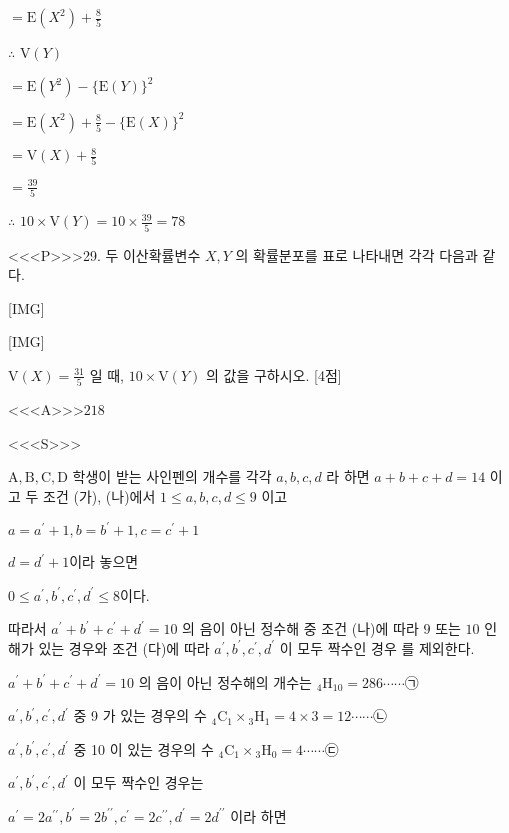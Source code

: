 \documentclass{oblivoir}
\begin{document}
$= \mathrm{E}\left(X^{2}\right)+\frac{8}{5}$

$\therefore$ $\mathrm{V}(Y)$

$=\mathrm{E}\left(Y^{2}\right)-\{\mathrm{E}(Y)\}^{2}$

$=\mathrm{E}\left(X^{2}\right)+\frac{8}{5}-\{\mathrm{E}(X)\}^{2}$

$=\mathrm{V}(X)+\frac{8}{5}$

$=\frac{39}{5}$

$\therefore$ $10 \times \mathrm{V}(Y)=10 \times \frac{39}{5}=78 $


<<<P>>>29. 두 이산확률변수 $X, Y$ 의 확률분포를 표로 나타내면 각각 다음과 같다.

[IMG]

[IMG]

$\mathrm{V}(X)=\frac{31}{5}$ 일 때, $10 \times \mathrm{V}(Y)$ 의 값을 구하시오. [4점]

<<<A>>>$218$

<<<S>>>



$\mathrm{A}, \mathrm{B}, \mathrm{C}, \mathrm{D}$ 학생이 받는 사인펜의 개수를 각각 $a, b, c, d$ 라 하면 $a+b+c+d=14$ 이고
두 조건 (가), (나)에서 $1 \leq a, b, c, d \leq 9$ 이고

$a=a^{\prime}+1, b=b^{\prime}+1, c=c^{\prime}+1$

$d=d^{\prime}+1$이라 놓으면

$0 \leq a^{\prime}, b^{\prime}, c^{\prime}, d^{\prime} \leq 8 $이다.

따라서 $a^{\prime}+b^{\prime}+c^{\prime}+d^{\prime}=10$ 의 음이 아닌 정수해 중 조건 (나)에 따라 $9$ 또는 $10$ 인 해가 있는 경우와 조건 (다)에 따라 $a^{\prime}, b^{\prime}, c^{\prime}, d^{\prime}$ 이 모두 짝수인 경우 를 제외한다.

$a^{\prime}+b^{\prime}+c^{\prime}+d^{\prime}=10$ 의 음이 아닌 정수해의 개수는
${ }_{4} \mathrm{H}_{10}=286 \cdots \cdots $㉠

$a^{\prime}, b^{\prime}, c^{\prime}, d^{\prime}$ 중 9 가 있는 경우의 수
${ }_{4} \mathrm{C}_{1} \times{ }_{3} \mathrm{H}_{1}=4 \times 3=12 \cdots \cdots $㉡

$a^{\prime}, b^{\prime}, c^{\prime}, d^{\prime}$ 중 10 이 있는 경우의 수
${ }_{4} \mathrm{C}_{1} \times{ }_{3} \mathrm{H}_{0}=4 \cdots \cdots $㉢

$a^{\prime}, b^{\prime}, c^{\prime}, d^{\prime}$ 이 모두 짝수인 경우는

$a^{\prime}=2 a^{\prime \prime}, b^{\prime}=2 b^{\prime \prime}, c^{\prime}=2 c^{\prime \prime}, d^{\prime}=2 d^{\prime \prime}$ 이라 하면
\end{document}
